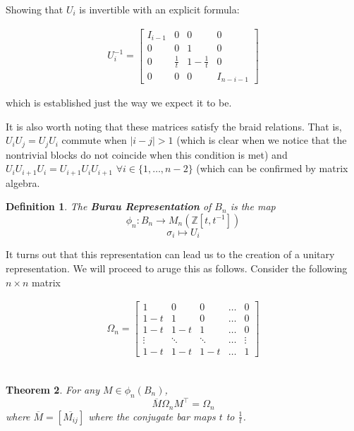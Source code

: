 \documentclass[10pt]{ucthesis}
\newcommand{\Z}{\mathbb{Z}}
\newtheorem{definition}{Definition}[chapter]
\newtheorem{theorem}[definition]{Theorem}
\begin{document}
Showing that $U_i$ is invertible with an explicit formula:

\begin{equation}
\begin{aligned}
	U_i^{-1}=\begin{bmatrix}
			I_{i-1}& 0 & 0 & 0 \\
			0 & 0 & 1 & 0\\
			0 & \frac{1}{t} & 1-\frac{1}{t} & 0\\
			0 & 0 & 0 & I_{n-i-1}
		\end{bmatrix}
\end{aligned}
\end{equation}

which is established just the way we expect it to be.

It is also worth noting that these matrices satisfy the braid relations. That is, $U_iU_j=U_jU_i$ commute when $|i-j|>1$ (which is clear when we notice that the nontrivial blocks do not coincide when this condition is met) and $U_iU_{i+1}U_i=U_{i+1}U_iU_{i+1}$ $\forall i\in\{1,\hdots,n-2\}$ (which can be confirmed by matrix algebra.

\begin{definition}
	The \textbf{Burau Representation} of $B_n$ is the map 
$$\phi_n:B_n\rightarrow M_n(\Z[t,t^{-1}])$$
$$\sigma_i \mapsto U_i$$
\end{definition}

It turns out that this representation can lead us to the creation of a unitary representation. We will proceed to aruge this as follows. Consider the following $n\times n$ matrix

\begin{equation}
\begin{aligned}
	\Omega_n = \begin{bmatrix}
						1 & 0 & 0 &\hdots & 0 \\
						1-t & 1 & 0 & \hdots & 0 \\
						1-t & 1-t & 1 & \hdots & 0 \\
						\vdots&\ddots&\ddots&\hdots&\vdots\\
						1-t & 1-t & 1-t & \hdots & 1
					\end{bmatrix}
\end{aligned}
\end{equation}\\

\begin{theorem}
	For any $M\in \phi_n(B_n)$, 
$$\overline{M}\Omega_nM^\intercal = \Omega_n$$
where $\overline{M}=[\overline{M_{ij}}]$ where the conjugate bar maps $t$ to $\frac{1}{t}$.
\end{theorem}
\end{document}
